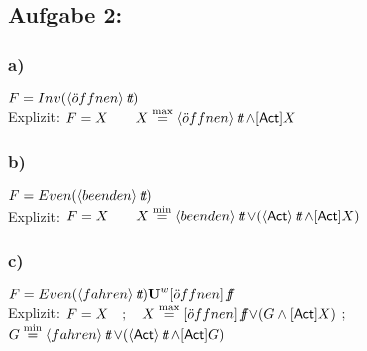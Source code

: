 \documentclass[10pt,a4paper,german,landscape,fleqn]{article} \usepackage[utf8]{inputenc} %
\begin{document}
\subsection*{Aufgabe 2:}
\subsubsection*{a)}
$F = Inv( \langle \ddot{o}ffnen \rangle \true )$ \\
Explizit: $ F=X \quad  \quad X \HMmax \langle \ddot{o}ffnen \rangle \true \wedge [\Act ]X$
\subsubsection*{b)}
$F = Even(\langle beenden \rangle \true) $ \\
Explizit: $ F=X \quad  \quad X \HMmin \langle beenden \rangle \true  \vee (\langle \Act \rangle \true \wedge [\Act]X) $
\subsubsection*{c)}
$F = Even(\langle fahren \rangle \true) \textbf{U}^w [\ddot{o}ffnen]\false$ \\
Explizit: $ F=X \quad ; \quad X \HMmax [\ddot{o}ffnen]\false \vee ( G \wedge [\Act ] X )$ \quad ; \quad
$G \HMmin \langle fahren \rangle \true \vee (\langle \Act \rangle \true \wedge [\Act]G )$\\
\end{document}

